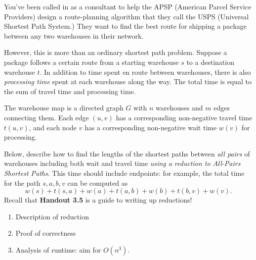 \documentclass[12 pt, letterpaper]{hmcpset}
\begin{document}
\begin{problem}
	You've been called in as a consultant to help the APSP (American Parcel Service Providers) design a route-planning algorithm that they call the USPS (Universal Shortest Path System.) They want to find the best route for shipping a package between any two warehouses in their network.

However, this is more than an ordinary shortest path problem. Suppose a package follows a certain route from a starting warehouse $s$ to a destination warehouse $t$. In addition to time spent en route between warehouses, there is also \emph{processing time} spent at each warehouse along the way. The total time is equal to the sum of travel time and processing time.

The warehouse map is a directed graph $G$ with $n$ warehouses and $m$ edges connecting them. Each edge $(u, v)$ has a corresponding
non-negative travel time $t(u, v)$, and each node $v$ has a corresponding
non-negative wait time $w(v)$ for processing.

Below, describe how to find the lengths of the shortest paths between \emph{all pairs} of warehouses including both wait and travel time \emph{using a reduction to All-Pairs Shortest Paths}. This time should include endpoints: for example, the total time for the path $s, a, b, v$ can be computed as
\[
    w(s) + t(s, a) + w(a) + t(a, b) + w(b) + t(b, v) + w(v).
\]
Recall that \textbf{Handout 3.5} is a guide to writing up reductions!

\begin{enumerate}
    \item {Description of reduction}
    
    \item {Proof of correctness}

    \item {Analysis of runtime}: aim for $O(n^3)$.
\end{enumerate}
\end{problem}
\end{document}
